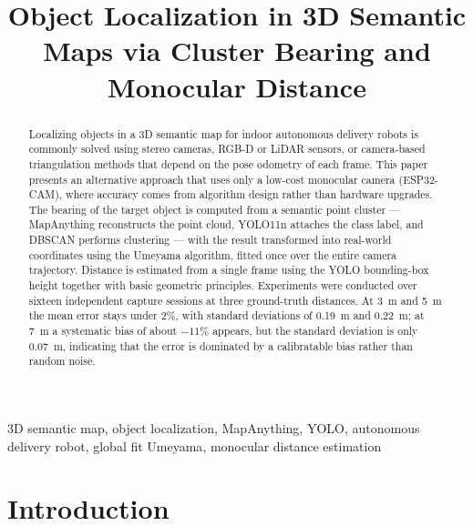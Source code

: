 \documentclass[conference]{IEEEtran}
\begin{document}
\title{Object Localization in 3D Semantic Maps via Cluster Bearing and Monocular Distance}

\author{
}

\maketitle

\begin{abstract}
Localizing objects in a 3D semantic map for indoor autonomous delivery robots is commonly solved using stereo cameras, RGB-D or LiDAR sensors, or camera-based triangulation methods that depend on the pose odometry of each frame. This paper presents an alternative approach that uses only a low-cost monocular camera (ESP32-CAM), where accuracy comes from algorithm design rather than hardware upgrades. The bearing of the target object is computed from a semantic point cluster --- MapAnything reconstructs the point cloud, YOLO11n attaches the class label, and DBSCAN performs clustering --- with the result transformed into real-world coordinates using the Umeyama algorithm, fitted once over the entire camera trajectory. Distance is estimated from a single frame using the YOLO bounding-box height together with basic geometric principles. Experiments were conducted over sixteen independent capture sessions at three ground-truth distances. At \SI{3}{\meter} and \SI{5}{\meter} the mean error stays under $2\%$, with standard deviations of \SI{0.19}{\meter} and \SI{0.22}{\meter}; at \SI{7}{\meter} a systematic bias of about $-11\%$ appears, but the standard deviation is only \SI{0.07}{\meter}, indicating that the error is dominated by a calibratable bias rather than random noise.
\end{abstract}

\begin{IEEEkeywords}
3D semantic map, object localization, MapAnything, YOLO, autonomous delivery robot, global fit Umeyama, monocular distance estimation
\end{IEEEkeywords}

\section{Introduction}
\end{document}

